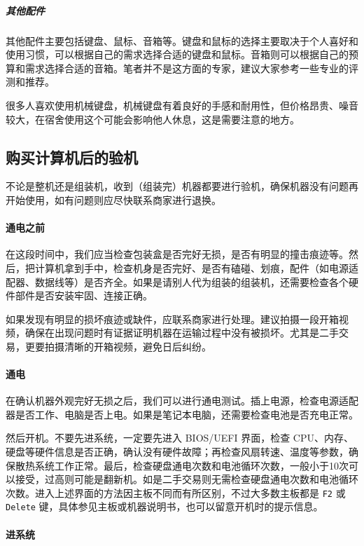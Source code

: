 \subparagraph{其他配件}

其他配件主要包括键盘、鼠标、音箱等。键盘和鼠标的选择主要取决于个人喜好和使用习惯，可以根据自己的需求选择合适的键盘和鼠标。音箱则可以根据自己的预算和需求选择合适的音箱。笔者并不是这方面的专家，建议大家参考一些专业的评测和推荐。

很多人喜欢使用机械键盘，机械键盘有着良好的手感和耐用性，但价格昂贵、噪音较大，在宿舍使用这个可能会影响他人休息，这是需要注意的地方。

\subsection{购买计算机后的验机}

不论是整机还是组装机，收到（组装完）机器都要进行验机，确保机器没有问题再开始使用，如有问题则应尽快联系商家进行退换。

\paragraph{通电之前}

在这段时间中，我们应当检查包装盒是否完好无损，是否有明显的撞击痕迹等。然后，把计算机拿到手中，检查机身是否完好、是否有磕碰、划痕，配件（如电源适配器、数据线等）是否齐全。如果是请别人代为组装的组装机，还需要检查各个硬件部件是否安装牢固、连接正确。

如果发现有明显的损坏痕迹或缺件，应联系商家进行处理。建议拍摄一段开箱视频，确保在出现问题时有证据证明机器在运输过程中没有被损坏。尤其是二手交易，更要拍摄清晰的开箱视频，避免日后纠纷。

\paragraph{通电}

在确认机器外观完好无损之后，我们可以进行通电测试。插上电源，检查电源适配器是否工作、电脑是否上电。如果是笔记本电脑，还需要检查电池是否充电正常。

然后开机。不要先进系统，一定要先进入 BIOS/UEFI 界面，检查 CPU、内存、硬盘等硬件信息是否正确，确认没有硬件故障；再检查风扇转速、温度等参数，确保散热系统工作正常。最后，检查硬盘通电次数和电池循环次数，一般小于10次可以接受，过高则可能是翻新机。如是二手交易则无需检查硬盘通电次数和电池循环次数。进入上述界面的方法因主板不同而有所区别，不过大多数主板都是 \verb|F2| 或 \verb|Delete| 键，具体参见主板或机器说明书，也可以留意开机时的提示信息。

\paragraph{进系统}


